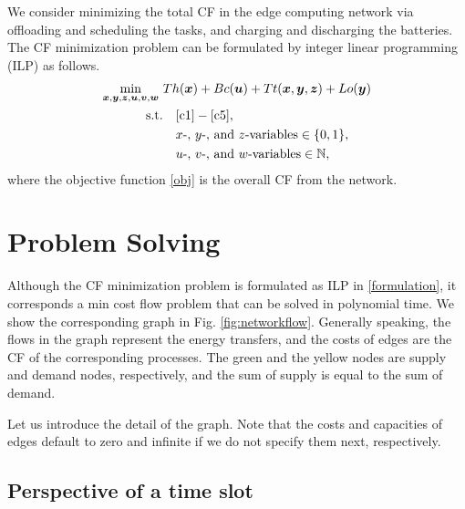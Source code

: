 \documentclass[conference, 10pt, ﬁnal, letterpaper, twocolumn]{IEEEtran}
\begin{document}
We consider minimizing the total CF in the edge computing network via offloading and scheduling the tasks, and charging and discharging the batteries. The CF minimization problem can be formulated by integer linear programming (ILP) as follows.
\begin{subequations}\label{formulation}
    \begin{align}
         \mathop{\min}_{\boldsymbol{x}, \boldsymbol{y}, \boldsymbol{z}, \boldsymbol{u}, \boldsymbol{v}, \boldsymbol{w}} \ &Th(\boldsymbol{x}) +  Bc(\boldsymbol{u}) + Tt(\boldsymbol{x}, \boldsymbol{y}, \boldsymbol{z}) + Lo(\boldsymbol{y}) \label{obj}\\
         \text{s.t.} & \quad \eqref{c1} - \eqref{c5},\notag\\
         & \quad x\text{-}\text{, } y\text{-}\text{, and } z\text{-variables} \in \{0,1\},\\
         & \quad u\text{-}\text{, } v\text{-}\text{, and } w\text{-variables} \in \mathbb{N},
    \end{align}
\end{subequations}
where the objective function \eqref{obj} is the overall CF from the network.

\section{Problem Solving} 


Although the CF minimization problem is formulated as ILP in \eqref{formulation}, it corresponds a min cost flow problem that can be solved in polynomial time. We show the corresponding graph in Fig. \ref{fig:networkflow}. Generally speaking, the flows in the graph represent the energy transfers, and the costs of edges are the CF of the corresponding processes. The green and the yellow nodes are supply and demand nodes, respectively, and the sum of supply is equal to the sum of demand.

Let us introduce the detail of the graph. Note that the costs and capacities of edges default to zero and infinite if we do not specify them next, respectively. 

\subsection{Perspective of a time slot}
\end{document}
